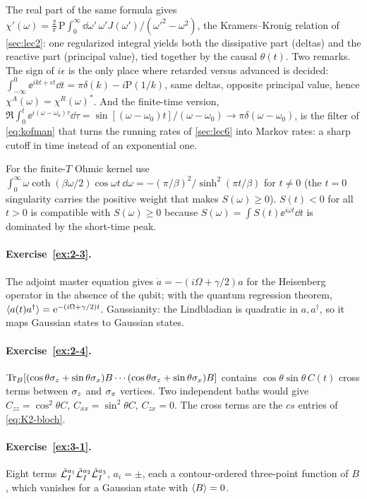 The real part of the same formula gives $\chi'(\omega)=\tfrac2\pi\,\mathrm P\!\int_0^\infty\dd\omega'\,\omega'J(\omega')/(\omega'^2-\omega^2)$, the Kramers--Kronig relation of \cref{sec:lec2}: one regularized integral yields both the dissipative part (deltas) and the reactive part (principal value), tied together by the causal $\theta(t)$.
Two remarks.
The sign of $i\epsilon$ is the only place where retarded versus advanced is decided: $\int_{-\infty}^0\ee^{ikt+\epsilon t}\dd t=\pi\delta(k)-i\mathrm P(1/k)$, same deltas, opposite principal value, hence $\chi^A(\omega)=\chi^R(\omega)^*$.
And the finite-time version, $\Re\int_0^t\ee^{i(\omega-\omega_0)\tau}\dd\tau=\sin[(\omega-\omega_0)t]/(\omega-\omega_0)\to\pi\delta(\omega-\omega_0)$, is the filter of \cref{eq:kofman} that turns the running rates of \cref{sec:lec6} into Markov rates: a sharp cutoff in time instead of an exponential one.

For the finite-$T$ Ohmic kernel use $\int_0^\infty\omega\coth(\beta\omega/2)\cos\omega t\,\dd\omega=-(\pi/\beta)^2/\sinh^2(\pi t/\beta)$ for $t\ne0$ (the $t=0$ singularity carries the positive weight that makes $S(\omega)\ge0$).
$S(t)<0$ for all $t>0$ is compatible with $S(\omega)\ge0$ because $S(\omega)=\int S(t)\ee^{i\omega t}\dd t$ is dominated by the short-time peak.

\paragraph{Exercise~\ref{ex:2-3}.}
The adjoint master equation gives $\dot a=-(i\Omega+\gamma/2)a$ for the Heisenberg operator in the absence of the qubit; with the quantum regression theorem, $\langle a(t)a^\dagger\rangle=\mathrm{e}^{-(i\Omega+\gamma/2)t}$.
Gaussianity: the Lindbladian is quadratic in $a,a^\dagger$, so it maps Gaussian states to Gaussian states.

\paragraph{Exercise~\ref{ex:2-4}.}
$\operatorname{Tr}_B[(\cos\theta\sigma_z+\sin\theta\sigma_x)B\cdots(\cos\theta\sigma_z+\sin\theta\sigma_x)B]$ contains $\cos\theta\sin\theta\,C(t)$ cross terms between $\sigma_z$ and $\sigma_x$ vertices.
Two independent baths would give $C_{zz}=\cos^2\theta C$, $C_{xx}=\sin^2\theta C$, $C_{zx}=0$.
The cross terms are the $cs$ entries of \cref{eq:K2-bloch}.

\paragraph{Exercise~\ref{ex:3-1}.}
Eight terms $\tilde{\mathcal{L}}_I^{a_1}\tilde{\mathcal{L}}_I^{a_2}\tilde{\mathcal{L}}_I^{a_3}$, $a_i=\pm$, each a contour-ordered three-point function of $B$, which vanishes for a Gaussian state with $\langle B\rangle=0$.


